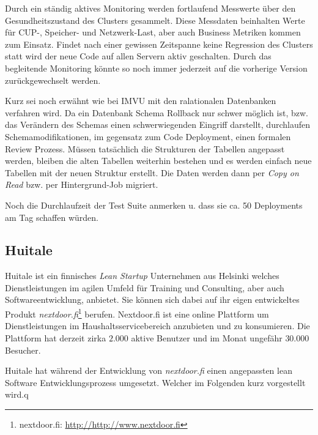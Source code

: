 Durch ein ständig aktives Monitoring werden fortlaufend Messwerte über den
Gesundheitszustand des Clusters gesammelt. Diese Messdaten beinhalten Werte
für CUP-, Speicher- und Netzwerk-Last, aber auch Business Metriken kommen zum
Einsatz. Findet nach einer gewissen Zeitspanne keine Regression des Clusters
statt wird der neue Code auf allen Servern aktiv geschalten. Durch das
begleitende Monitoring könnte so noch immer jederzeit auf die vorherige
Version zurückgewechselt werden.

Kurz sei noch erwähnt wie bei IMVU mit den ralationalen Datenbanken verfahren
wird. Da ein Datenbank Schema Rollback nur schwer möglich ist, bzw. das
Verändern des Schemas einen schwerwiegenden Eingriff darstellt, durchlaufen
Schemamodifikationen, im gegensatz zum Code Deployment, einen formalen Review
Prozess. Müssen tatsächlich die Strukturen der Tabellen angepasst werden,
bleiben die  alten Tabellen weiterhin bestehen und es werden einfach neue
Tabellen mit der neuen Struktur erstellt. Die Daten werden dann per \emph{Copy
on Read} bzw. per Hintergrund-Job migriert.

\begin{wichtigbox}
Noch die Durchlaufzeit der Test Suite anmerken u. dass sie ca. 50 Deployments
am Tag schaffen würden.
\end{wichtigbox}


\subsection{Huitale}

Huitale ist ein finnisches \emph{Lean Startup} Unternehmen aus Helsinki
welches Dienstleistungen im agilen Umfeld für Training und Consulting, aber
auch Softwareentwicklung, anbietet. Sie können sich dabei auf ihr eigen
entwickeltes Produkt \emph{nextdoor.fi}\footnote{nextdoor.fi:
\url{http://http://www.nextdoor.fi}} berufen. Nextdoor.fi ist eine online
Plattform um Dienstleistungen im Haushaltsservicebereich anzubieten und zu
konsumieren. Die Plattform hat derzeit zirka $2.000$ aktive Benutzer und im
Monat ungefähr $30.000$ Besucher.

Huitale hat während der Entwicklung von \emph{nextdoor.fi} einen angepassten
lean Software Entwicklungsprozess umgesetzt. Welcher im Folgenden kurz
vorgestellt wird.q

